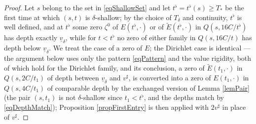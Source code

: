 \documentclass[11pt,twoside,reqno]{amsart}
\def\ti{\tilde}
\def\d{\delta}
\def\uv{\underline{v}_{\d}}
\theoremstyle{plain}
\numberwithin{equation}{section}
\begin{document}
\begin{proof}
Let $s$ belong to the set in \eqref{eqShallowSet} and let $t^\flat=t^\flat(s)\geq T_*$ be the first time at which $(s,t)$ is $\d$-shallow; by the choice of $T_\d$ and continuity, $t^\flat$ is well defined, and at $t^\flat$ some zero $\zeta^0$ of $E(t^\flat,\cdot)$ or of $\ti E(t^\flat,\cdot)$ in $Q(s,16C/t^\flat)$ has depth exactly $\uv$, while for $t<t^\flat$ no zero of either family in $Q(s,16C/t)$ has depth below $\uv$. We treat the case of a zero of $E$; the Dirichlet case is identical --- the argument below uses only the pattern \eqref{eqPattern} and the value rigidity, both of which hold for the Dirichlet family, and its conclusion, a zero of $\ti E(t_1,\cdot)$ in $Q(s,2C/t_1)$ of depth between $\uv$ and $v^\sharp$, is converted into a zero of $E(t_1,\cdot)$ in $Q(s,4C/t_1)$ of comparable depth by the exchanged version of Lemma \ref{lemPair} (the pair $(s,t_1)$ is not $\d$-shallow since $t_1<t^\flat$, and the depths match by \eqref{eqDepthMatch}); Proposition \ref{propFirstEntry} is then applied with $2v^\sharp$ in place of $v^\sharp$.


\end{proof}
\end{document}
